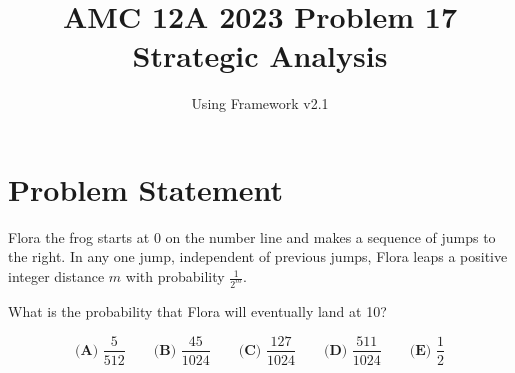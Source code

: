 \documentclass[11pt]{article}
\begin{document}
\title{\textbf{AMC 12A 2023 Problem 17}\\Strategic Analysis}
\author{Using Framework v2.1}
\date{}
\maketitle

\section*{Problem Statement}

Flora the frog starts at 0 on the number line and makes a sequence of jumps to the right. In any one jump, independent of previous jumps, Flora leaps a positive integer distance $m$ with probability $\frac{1}{2^m}$.

What is the probability that Flora will eventually land at 10?

\[\textbf{(A) } \frac{5}{512} \qquad \textbf{(B) } \frac{45}{1024} \qquad \textbf{(C) } \frac{127}{1024} \qquad \textbf{(D) } \frac{511}{1024} \qquad \textbf{(E) } \frac{1}{2}\]
\end{document}
